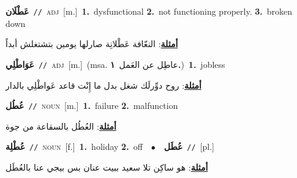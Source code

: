 \documentclass[10pt,a4paper,twoside]{article} %
\begin{document}
\begin{multicols}{2}
{\setlength\topsep{0pt}\textbf{\foreignlanguage{arabic}{عَطْلَان}}\ {\color{gray}\texttt{//}\color{black}}\ \textsc{adj}\ [m.]\ \textbf{1.}~dysfunctional  \textbf{2.}~not functioning properly.  \textbf{3.}~broken down\  \begin{flushright}\color{gray}\foreignlanguage{arabic}{\textbf{\underline{\foreignlanguage{arabic}{أمثلة}}}: النعّافة عَطْلانِة صارلها يومين بتشتغلش أبداً}\end{flushright}\color{black}} \vspace{2mm}

{\setlength\topsep{0pt}\textbf{\foreignlanguage{arabic}{عَوَاطْلِي}}\ {\color{gray}\texttt{//}\color{black}}\ \textsc{adj}\ [m.]\ \color{gray}(msa. \foreignlanguage{arabic}{عاطِل عن العَمل}~\foreignlanguage{arabic}{\textbf{١.}})\color{black}\ \textbf{1.}~jobless\  \begin{flushright}\color{gray}\foreignlanguage{arabic}{\textbf{\underline{\foreignlanguage{arabic}{أمثلة}}}: روح دوِّرلَك شغل بدل ما إِنْت قاعد عَواطْلِي بالدار}\end{flushright}\color{black}} \vspace{2mm}

{\setlength\topsep{0pt}\textbf{\foreignlanguage{arabic}{عُطُل}}\ {\color{gray}\texttt{//}\color{black}}\ \textsc{noun}\ [m.]\ \textbf{1.}~failure  \textbf{2.}~malfunction\  \begin{flushright}\color{gray}\foreignlanguage{arabic}{\textbf{\underline{\foreignlanguage{arabic}{أمثلة}}}: العُطُل بالسقاعة من جوة}\end{flushright}\color{black}} \vspace{2mm}

{\setlength\topsep{0pt}\textbf{\foreignlanguage{arabic}{عُطْلِة}}\ {\color{gray}\texttt{//}\color{black}}\ \textsc{noun}\ [f.]\ \textbf{1.}~holiday  \textbf{2.}~off\ \ $\bullet$\ \ \setlength\topsep{0pt}\textbf{\foreignlanguage{arabic}{عُطَل}}\ {\color{gray}\texttt{//}\color{black}}\ [pl.]\  \begin{flushright}\color{gray}\foreignlanguage{arabic}{\textbf{\underline{\foreignlanguage{arabic}{أمثلة}}}: هو ساكِن تلا سعيد ببيت عنان بس بيجي عنا بالعُطَل}\end{flushright}\color{black}} \vspace{2mm}


\end{multicols}
\end{document}
